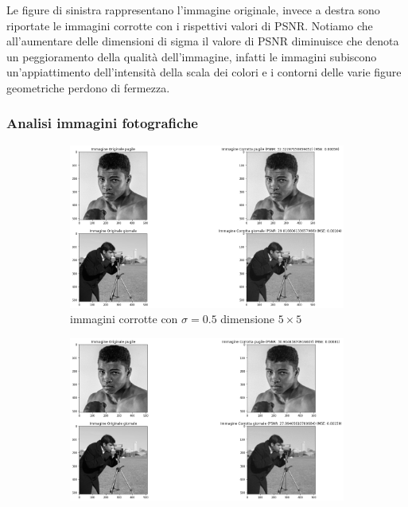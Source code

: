 Le figure di sinistra rappresentano l'immagine originale, invece a destra sono riportate le immagini corrotte con i rispettivi valori di PSNR. 
Notiamo che all'aumentare delle dimensioni di sigma il valore di PSNR diminuisce che denota un peggioramento della qualità dell'immagine, 
infatti le immagini subiscono un'appiattimento dell'intensità della scala dei colori e i contorni delle varie figure geometriche perdono di fermezza. 

\subsubsection{Analisi immagini fotografiche}
\begin{figure}[H]
    \centering
    \begin{subfigure}{0.67\textwidth}
        \centering
        \includegraphics[width=\textwidth]{confrontiPuntoUno/5-0.5-0.02.png}
        \caption{immagini corrotte con $\sigma = 0.5$ dimensione $5 \times 5$}
        \label{fig:fotogrCorrotte5x5}
    \end{subfigure}
    \begin{subfigure}{0.67\textwidth}
        \centering
        \includegraphics[width=\textwidth]{confrontiPuntoUno/7-1-0.02.png}

\end{subfigure}
\end{figure}
